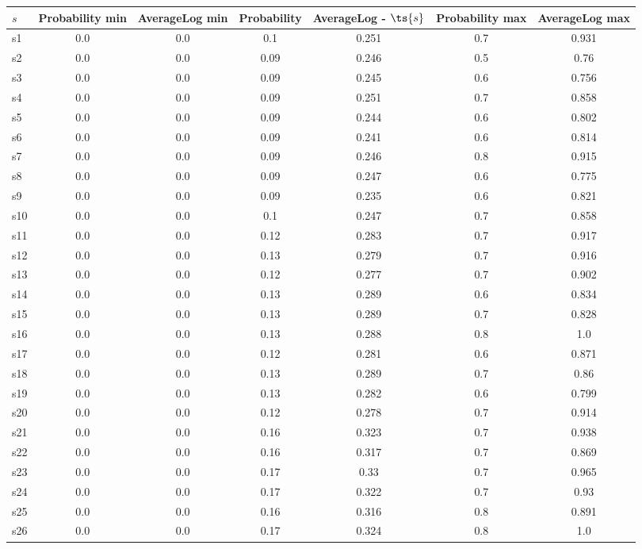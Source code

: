 \documentclass{article}
\begin{document}
\noindent\begin{tabular}{|l|c|c|c|c|c|c|}
\hline
$s$& Probability min & AverageLog min & Probability & AverageLog - $\ts{s}$ & Probability max & AverageLog max\\
\hline
s1 &0.0 & 0.0 & 0.1 & 0.251 & 0.7 & 0.931\\
\hline
s2 &0.0 & 0.0 & 0.09 & 0.246 & 0.5 & 0.76\\
\hline
s3 &0.0 & 0.0 & 0.09 & 0.245 & 0.6 & 0.756\\
\hline
s4 &0.0 & 0.0 & 0.09 & 0.251 & 0.7 & 0.858\\
\hline
s5 &0.0 & 0.0 & 0.09 & 0.244 & 0.6 & 0.802\\
\hline
s6 &0.0 & 0.0 & 0.09 & 0.241 & 0.6 & 0.814\\
\hline
s7 &0.0 & 0.0 & 0.09 & 0.246 & 0.8 & 0.915\\
\hline
s8 &0.0 & 0.0 & 0.09 & 0.247 & 0.6 & 0.775\\
\hline
s9 &0.0 & 0.0 & 0.09 & 0.235 & 0.6 & 0.821\\
\hline
s10 &0.0 & 0.0 & 0.1 & 0.247 & 0.7 & 0.858\\
\hline
s11 &0.0 & 0.0 & 0.12 & 0.283 & 0.7 & 0.917\\
\hline
s12 &0.0 & 0.0 & 0.13 & 0.279 & 0.7 & 0.916\\
\hline
s13 &0.0 & 0.0 & 0.12 & 0.277 & 0.7 & 0.902\\
\hline
s14 &0.0 & 0.0 & 0.13 & 0.289 & 0.6 & 0.834\\
\hline
s15 &0.0 & 0.0 & 0.13 & 0.289 & 0.7 & 0.828\\
\hline
s16 &0.0 & 0.0 & 0.13 & 0.288 & 0.8 & 1.0\\
\hline
s17 &0.0 & 0.0 & 0.12 & 0.281 & 0.6 & 0.871\\
\hline
s18 &0.0 & 0.0 & 0.13 & 0.289 & 0.7 & 0.86\\
\hline
s19 &0.0 & 0.0 & 0.13 & 0.282 & 0.6 & 0.799\\
\hline
s20 &0.0 & 0.0 & 0.12 & 0.278 & 0.7 & 0.914\\
\hline
s21 &0.0 & 0.0 & 0.16 & 0.323 & 0.7 & 0.938\\
\hline
s22 &0.0 & 0.0 & 0.16 & 0.317 & 0.7 & 0.869\\
\hline
s23 &0.0 & 0.0 & 0.17 & 0.33 & 0.7 & 0.965\\
\hline
s24 &0.0 & 0.0 & 0.17 & 0.322 & 0.7 & 0.93\\
\hline
s25 &0.0 & 0.0 & 0.16 & 0.316 & 0.8 & 0.891\\
\hline
s26 &0.0 & 0.0 & 0.17 & 0.324 & 0.8 & 1.0\\

\end{tabular}
\end{document}
